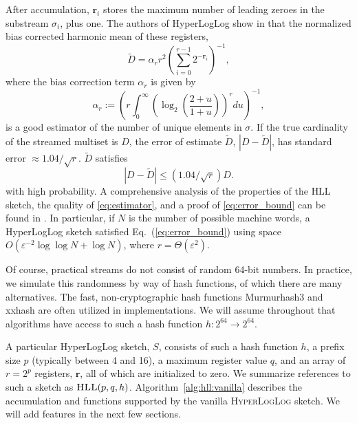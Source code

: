 \documentclass[10]{report}
\newcommand{\algoname}[1]{\textnormal{\textsc{#1}}}
\begin{document}
After accumulation, $\mathbf{r}_i$ stores the maximum number of leading zeroes in the substream $\sigma_i$, plus one. 
The authors of HyperLogLog show in \cite{flajolet2007hyperloglog} that the normalized bias corrected harmonic mean of these registers,
%
\begin{equation} \label{eq:estimator}
\widetilde{D} = \alpha_r r^2 \left ( \sum_{i=0}^{r-1} 2^{-\mathbf{r}_i} \right) ^{-1},
\end{equation}
%
where the bias correction term $\alpha_r$ is given by
%
%
\begin{equation} \label{eq:alpha}
\alpha_r :=  \left( r \int_{0}^\infty \left( \log_2 \left( \frac{2 + u}{1 + u} \right) \right)^r du \right) ^{-1},
\end{equation}
is a good estimator of the number of unique elements in $\sigma$.
If the true cardinality of the streamed multiset is $D$, the error of estimate $\widetilde{D}$, $|D - \widetilde{D}|$, has standard error $\approx 1.04 / \sqrt{r}$. 
$\widetilde{D}$ satisfies
%
\begin{equation} \label{eq:error_bound}
|D - \widetilde{D}| \leq (1.04/\sqrt{r}) D.
\end{equation}
%
 with high probability.
A comprehensive analysis of the properties of the \algoname{HLL} sketch,  the quality of \eqref{eq:estimator}, and a proof of \eqref{eq:error_bound}  can be found in \cite{flajolet2007hyperloglog}.
In particular, if $N$ is the number of possible machine words, a HyperLogLog sketch satisfied Eq.~(\ref{eq:error_bound}) using space $O(\varepsilon^{-2} \log\log N + \log N)$, where $r = \Theta(\varepsilon^2)$.

Of course, practical streams do not consist of random 64-bit numbers. 
In practice, we simulate this randomness by way of hash functions, of which there are many alternatives. 
The fast, non-cryptographic hash functions Murmurhash3 \cite{murmurhash3} and xxhash \cite{xxhash} are often utilized in implementations. 
We will assume throughout that algorithms have access to such a hash function $h : 2^{64} \rightarrow 2^{64}$.

A particular HyperLogLog sketch, $S$, consists of such a hash function $h$, a prefix size $p$ (typically between 4 and 16), a maximum register value $q$, and an array of $r=2^p$ registers, $\mathbf{r}$, all of which are initialized to zero. 
We summarize references to such a sketch as $\algoname{HLL}(p,q,h)$.
Algorithm~\ref{alg:hll:vanilla} describes the accumulation and functions supported by the vanilla \algoname{HyperLogLog} sketch. 
We will add features in the next few sections. 
\end{document}
